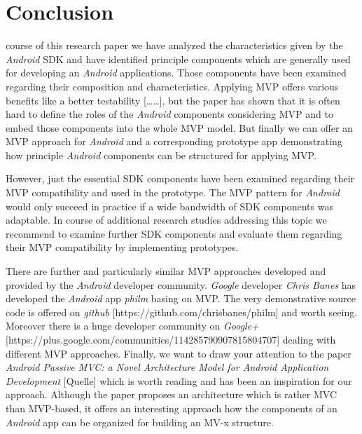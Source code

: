 \section{Conclusion}

 course of this research paper we have analyzed the characteristics given by the \emph{Android} SDK and have identified 
principle components which are generally used for developing an \emph{Android} applications. Those components have been examined regarding their composition and characteristics. 
Applying MVP offers various benefits like a better testability [……], but the paper has shown that it is often hard to define the roles 
of the \emph{Android} components considering MVP and to embed those components into the whole MVP model. But finally we can offer an MVP approach 
for \emph{Android} and a corresponding prototype app demonstrating how principle \emph{Android} components can be structured for applying MVP.
	
However, just the essential SDK components have been examined regarding their MVP compatibility and used in the prototype. 
The MVP pattern for \emph{Android} would only succeed in practice if a wide bandwidth of SDK components was adaptable. 
In course of additional research studies addressing this topic we recommend to examine further SDK components and 
evaluate them regarding their MVP compatibility by implementing prototypes.

There are further and particularly similar MVP approaches developed and provided by the \emph{Android} developer community. 
\emph{Google} developer \emph{Chris Banes} has developed the \emph{Android} app \emph{philm} basing on MVP. 
The very demonstrative source code is offered on \emph{github} [https://github.com/chrisbanes/philm] and worth seeing. 
Moreover there is a huge developer community on \emph{Google+} [https://plus.google.com/communities/114285790907815804707] dealing with different MVP approaches. 
Finally, we want to draw your attention to the paper \emph{Android Passive MVC: a Novel Architecture Model for Android Application Development} 
[Quelle] which is worth reading and has been an inspiration for our approach. Although the paper proposes an architecture which is rather MVC than MVP-based, 
it offers an interesting approach how the components of an \emph{Android} app can be organized for building an MV-x structure. 
